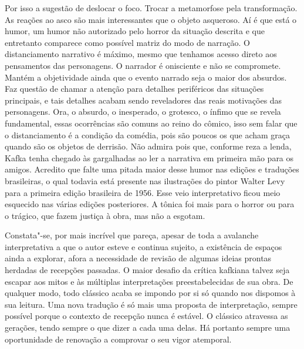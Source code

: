 Por isso a sugestão de deslocar o foco. Trocar a metamorfose pela
transformação. As reações ao asco são mais interessantes que o objeto
asqueroso. Aí é que está o humor, um humor não autorizado pelo horror
da situação descrita e que entretanto comparece como possível matriz do
modo de narração. O distanciamento narrativo é máximo, mesmo que
tenhamos acesso direto aos pensamentos das personagens. O narrador é
onisciente e não se compromete. Mantém a objetividade ainda que o
evento narrado seja o maior dos absurdos. Faz questão de chamar a
atenção para detalhes periféricos das situações principais, e tais
detalhes acabam sendo reveladores das reais motivações das personagens.
Ora, o absurdo, o inesperado, o grotesco, o ínfimo que se revela
fundamental, essas ocorrências são comuns ao reino do cômico, isso sem
falar que o distanciamento é a condição da comédia, pois são poucos os
que acham graça quando são os objetos de derrisão. Não admira pois que,
conforme reza a lenda, Kafka tenha chegado às gargalhadas ao ler a
narrativa em primeira mão para os amigos. Acredito que falte uma pitada
maior desse humor nas edições e traduções brasileiras, o qual todavia
está presente nas ilustrações do pintor Walter Levy para a primeira
edição brasileira de 1956. Esse veio interpretativo ficou meio esquecido nas
várias edições posteriores. A tônica foi mais para o horror ou para o
trágico, que fazem justiça à obra, mas não a esgotam.

Constata"-se, por mais incrível que pareça, apesar de toda a avalanche
interpretativa a que o autor esteve e continua sujeito, a existência de
espaços ainda a explorar, afora a necessidade de revisão de algumas
ideias prontas herdadas de recepções passadas. O maior desafio da
crítica kafkiana talvez seja escapar aos mitos e às múltiplas
interpretações preestabelecidas de sua obra. De qualquer modo, todo
clássico acaba se impondo por si só quando nos dispomos à sua leitura.
Uma nova tradução é só mais uma proposta de interpretação, sempre
possível porque o contexto de recepção nunca é estável. O clássico
atravessa as gerações, tendo sempre o que dizer a cada uma delas. Há
portanto sempre uma oportunidade de renovação a comprovar o seu vigor
atemporal.
